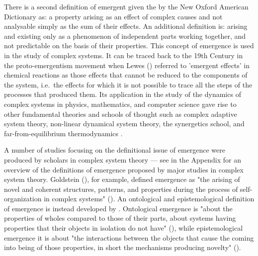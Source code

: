\documentclass[11pt]{article}
\begin{document}
There is a second definition of emergent given the by the New Oxford American Dictionary as: a property arising as an effect of complex causes and not analysable simply as the sum of their effects. An additional definition is: arising and existing only as a phenomenon of independent parts working together, and not predictable on the basis of their properties. This concept of emergence is used in the study of complex systems. It can be traced back to the 19th Century in the proto-emergentism movement when Lewes (\citeyear{Lewes1875}) referred to 'emergent effects' in chemical reactions as those effects that cannot be reduced to the components of the system, i.e.\ the effects for which it is not possible to trace all the steps of the processes that produced them. Its application in the study of the dynamics of complex systems in physics, mathematics, and computer science gave rise to other fundamental theories and schools of thought such as complex adaptive system theory, non-linear dynamical system theory, the synergetics school, and far-from-equilibrium thermodynamics \citep[see][]{Goldstein1999}. 

A number of studies focusing on the definitional issue of emergence were produced by scholars in complex system theory --- see  in the Appendix for an overview of the definitions of emergence proposed by major studies in complex system theory. Goldstein (\citeyear{Goldstein1999}), for example, defined emergence as "the arising of novel and coherent structures, patterns, and properties during the process of self-organization in complex systems" (\citeyear[p. 49]{Goldstein1999}). An ontological and epistemological definition of emergence is instead developed by \cite{DeHaan2006}. Ontological emergence is "about the properties of wholes compared to those of their parts, about systems having properties that their objects in isolation do not have" (\citeyear[p. 294]{DeHaan2006}), while epistemological emergence it is about "the interactions between the objects that cause the coming into being of those properties, in short the mechanisms producing novelty" (\citeyear[p. 294]{DeHaan2006}). 
\end{document}

